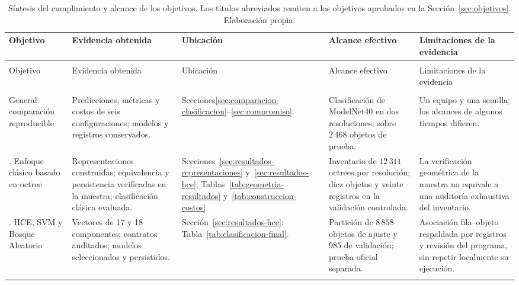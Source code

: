 \begingroup\small\singlespacing
\setlength{\tabcolsep}{3pt}
\renewcommand{\arraystretch}{1.03}
\begin{longtable}{@{}>{\raggedright\arraybackslash}p{1.9cm}>{\raggedright\arraybackslash}p{3.05cm}>{\raggedright\arraybackslash}p{2.15cm}>{\raggedright\arraybackslash}p{2.9cm}>{\raggedright\arraybackslash}p{3.0cm}@{}}
\caption{Síntesis del cumplimiento y alcance de los objetivos. Los títulos abreviados remiten a los objetivos aprobados en la Sección~\ref{sec:objetivos}. Elaboración propia.}\label{tab:sintesis-objetivos}\\
\toprule Objetivo & Evidencia obtenida & Ubicación & Alcance efectivo & Limitaciones de la evidencia \\\midrule\endfirsthead
\multicolumn{5}{l}{\tablename~\thetable\ (continuación)}\\\toprule
Objetivo & Evidencia obtenida & Ubicación & Alcance efectivo & Limitaciones de la evidencia \\\midrule\endhead
\midrule\multicolumn{5}{r}{Continúa en la página siguiente}\\\endfoot
\bottomrule\endlastfoot
General: comparación reproducible & Predicciones, métricas y costos de seis configuraciones; modelos y registros conservados. & Secciones\newline\ref{sec:comparacion-clasificacion}--\ref{sec:compromiso}. & Clasificación de ModelNet40 en dos resoluciones, sobre $2\,468$ objetos de prueba. & Un equipo y una semilla; los alcances de algunos tiempos difieren. \\ \addlinespace
1. Enfoque clásico basado en octree & Representaciones construidas; equivalencia y persistencia verificadas en la muestra; clasificación clásica evaluada. & Secciones~\ref{sec:resultados-representaciones} y~\ref{sec:resultados-hce}; Tablas~\ref{tab:geometria-resultados} y~\ref{tab:construccion-costos}. & Inventario de $12\,311$ octrees por resolución; diez objetos y veinte registros en la validación controlada. & La verificación geométrica de la muestra no equivale a una auditoría exhaustiva del inventario. \\ \addlinespace
2. HCE, SVM y Bosque Aleatorio & Vectores de 17 y 18 componentes; contratos auditados; modelos seleccionados y persistidos. & Sección~\ref{sec:resultados-hce}; Tabla~\ref{tab:clasificacion-final}. & Partición de $8\,858$ objetos de ajuste y 985 de validación; prueba oficial separada. & Asociación fila--objeto respaldada por registros y revisión del programa, sin repetir localmente su ejecución. \\ \addlinespace

\end{longtable}
